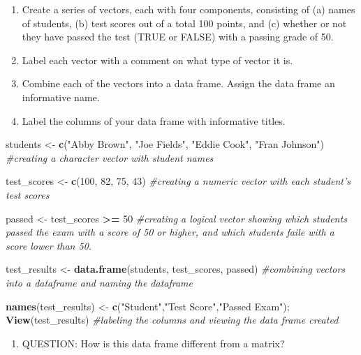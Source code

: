 \documentclass[]{article}
\newenvironment{Shaded}{\begin{snugshade}}{\end{snugshade}}
\newcommand{\CommentTok}[1]{\textcolor[rgb]{0.56,0.35,0.01}{\textit{#1}}}
\newcommand{\DecValTok}[1]{\textcolor[rgb]{0.00,0.00,0.81}{#1}}
\newcommand{\KeywordTok}[1]{\textcolor[rgb]{0.13,0.29,0.53}{\textbf{#1}}}
\newcommand{\NormalTok}[1]{#1}
\newcommand{\OperatorTok}[1]{\textcolor[rgb]{0.81,0.36,0.00}{\textbf{#1}}}
\newcommand{\StringTok}[1]{\textcolor[rgb]{0.31,0.60,0.02}{#1}}
\providecommand{\tightlist}{%
  \setlength{\itemsep}{0pt}\setlength{\parskip}{0pt}}
\begin{document}
\begin{enumerate}
\def\labelenumi{\arabic{enumi}.}
\setcounter{enumi}{4}
\item
  Create a series of vectors, each with four components, consisting of
  (a) names of students, (b) test scores out of a total 100 points, and
  (c) whether or not they have passed the test (TRUE or FALSE) with a
  passing grade of 50.
\item
  Label each vector with a comment on what type of vector it is.
\item
  Combine each of the vectors into a data frame. Assign the data frame
  an informative name.
\item
  Label the columns of your data frame with informative titles.
\end{enumerate}

\begin{Shaded}
\begin{Highlighting}[]
\NormalTok{students <-}\StringTok{ }\KeywordTok{c}\NormalTok{(}\StringTok{"Abby Brown"}\NormalTok{, }\StringTok{"Joe Fields"}\NormalTok{, }\StringTok{"Eddie Cook"}\NormalTok{, }\StringTok{"Fran Johnson"}\NormalTok{) }\CommentTok{#creating a character vector with student names}

\NormalTok{test_scores <-}\StringTok{ }\KeywordTok{c}\NormalTok{(}\DecValTok{100}\NormalTok{, }\DecValTok{82}\NormalTok{, }\DecValTok{75}\NormalTok{, }\DecValTok{43}\NormalTok{) }\CommentTok{#creating a numeric vector with each student's test scores}

\NormalTok{passed <-}\StringTok{ }\NormalTok{test_scores }\OperatorTok{>=}\StringTok{ }\DecValTok{50} \CommentTok{#creating a logical vector showing which students passed the exam with a score of 50 or higher, and which students faile with a score lower than 50.}

\NormalTok{test_results <-}\StringTok{ }\KeywordTok{data.frame}\NormalTok{(students, test_scores, passed) }\CommentTok{#combining vectors into a dataframe and naming the dataframe}

\KeywordTok{names}\NormalTok{(test_results) <-}\StringTok{ }\KeywordTok{c}\NormalTok{(}\StringTok{"Student"}\NormalTok{,}\StringTok{"Test Score"}\NormalTok{,}\StringTok{"Passed Exam"}\NormalTok{); }\KeywordTok{View}\NormalTok{(test_results) }\CommentTok{#labeling the columns and viewing the data frame created}
\end{Highlighting}
\end{Shaded}

\begin{enumerate}
\def\labelenumi{\arabic{enumi}.}
\setcounter{enumi}{8}
\tightlist
\item
  QUESTION: How is this data frame different from a matrix?
\end{enumerate}
\end{document}
